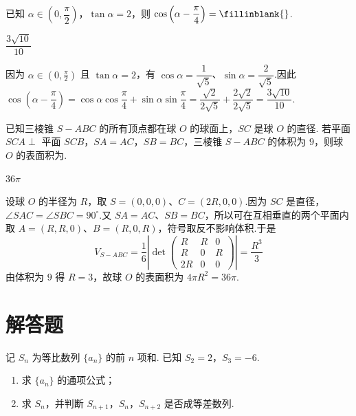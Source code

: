 \begin{problem}
已知 \(\alpha\in(0,\dfrac{\pi}{2})\)，\(\tan\alpha=2\)，则 \(\cos\left(\alpha-\dfrac{\pi}{4}\right)=\fillinblank{}\).
\end{problem}

\begin{answer}
\(\dfrac{3\sqrt{10}}{10}\)
\end{answer}

\begin{solution}
因为 \(\alpha\in(0,\frac\pi2)\) 且 \(\tan\alpha=2\)，有 \(\cos\alpha=\dfrac1{\sqrt5}\)、\(\sin\alpha=\dfrac2{\sqrt5}\).因此 \(\cos\left(\alpha-\dfrac\pi4\right)=\cos\alpha\cos\dfrac\pi4+\sin\alpha\sin\dfrac\pi4=\dfrac{\sqrt2}{2\sqrt5}+\dfrac{2\sqrt2}{2\sqrt5}=\dfrac{3\sqrt{10}}{10}\).
\end{solution}

\begin{problem}
已知三棱锥 \(S-ABC\) 的所有顶点都在球 \(O\) 的球面上，\(SC\) 是球 \(O\) 的直径. 若平面 \(SCA\perp\) 平面 \(SCB\)，\(SA=AC\)，\(SB=BC\)，三棱锥 \(S-ABC\) 的体积为 \(9\)，则球 \(O\) 的表面积为\fillinblank{}.
\end{problem}

\begin{answer}
\(36\pi\)
\end{answer}

\begin{solution}
设球 \(O\) 的半径为 \(R\)，取 \(S=(0,0,0)\)、\(C=(2R,0,0)\).因为 \(SC\) 是直径，\(\angle SAC=\angle SBC=90^\circ\).又 \(SA=AC\)、\(SB=BC\)，所以可在互相垂直的两个平面内取 \(A=(R,R,0)\)、\(B=(R,0,R)\)，符号取反不影响体积.于是
\[
V_{S-ABC}=\frac16\left|\det\begin{pmatrix}R&R&0\\ R&0&R\\ 2R&0&0\end{pmatrix}\right|=\frac{R^3}{3}
\]
由体积为 \(9\) 得 \(R=3\)，故球 \(O\) 的表面积为 \(4\pi R^2=36\pi\).
\end{solution}

\section{解答题}

\begin{problem}
记 \(S_n\) 为等比数列 \(\{a_n\}\) 的前 \(n\) 项和. 已知 \(S_2=2\)，\(S_3=-6\).

\begin{enumerate}
\item 求 \(\{a_n\}\) 的通项公式；
\item 求 \(S_n\)，并判断 \(S_{n+1}\)，\(S_n\)，\(S_{n+2}\) 是否成等差数列.
\end{enumerate}
\end{problem}

